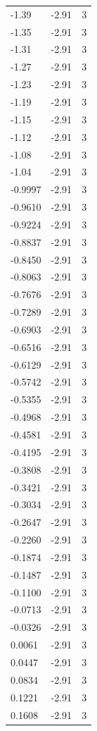\begin{longtable}{lrr}
  -1.39 & -2.91 & 3 \\
  -1.35 & -2.91 & 3 \\
  -1.31 & -2.91 & 3 \\
  -1.27 & -2.91 & 3 \\
  -1.23 & -2.91 & 3 \\
  -1.19 & -2.91 & 3 \\
  -1.15 & -2.91 & 3 \\
  -1.12 & -2.91 & 3 \\
  -1.08 & -2.91 & 3 \\
  -1.04 & -2.91 & 3 \\
  -0.9997 & -2.91 & 3 \\
  -0.9610 & -2.91 & 3 \\
  -0.9224 & -2.91 & 3 \\
  -0.8837 & -2.91 & 3 \\
  -0.8450 & -2.91 & 3 \\
  -0.8063 & -2.91 & 3 \\
  -0.7676 & -2.91 & 3 \\
  -0.7289 & -2.91 & 3 \\
  -0.6903 & -2.91 & 3 \\
  -0.6516 & -2.91 & 3 \\
  -0.6129 & -2.91 & 3 \\
  -0.5742 & -2.91 & 3 \\
  -0.5355 & -2.91 & 3 \\
  -0.4968 & -2.91 & 3 \\
  -0.4581 & -2.91 & 3 \\
  -0.4195 & -2.91 & 3 \\
  -0.3808 & -2.91 & 3 \\
  -0.3421 & -2.91 & 3 \\
  -0.3034 & -2.91 & 3 \\
  -0.2647 & -2.91 & 3 \\
  -0.2260 & -2.91 & 3 \\
  -0.1874 & -2.91 & 3 \\
  -0.1487 & -2.91 & 3 \\
  -0.1100 & -2.91 & 3 \\
  -0.0713 & -2.91 & 3 \\
  -0.0326 & -2.91 & 3 \\
  0.0061 & -2.91 & 3 \\
  0.0447 & -2.91 & 3 \\
  0.0834 & -2.91 & 3 \\
  0.1221 & -2.91 & 3 \\
  0.1608 & -2.91 & 3 \\

\end{longtable}
